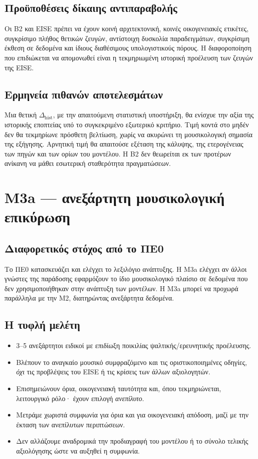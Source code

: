 \documentclass[11pt,a4paper]{extarticle}
\begin{document}
\subsection*{Προϋποθέσεις δίκαιης αντιπαραβολής}
Οι B2 και EISE πρέπει να έχουν κοινή αρχιτεκτονική, κοινές οικογενειακές ετικέτες, συγκρίσιμο πλήθος θετικών ζευγών, αντίστοιχη δυσκολία παραδειγμάτων, συγκρίσιμη έκθεση σε δεδομένα και ίδιους διαθέσιμους υπολογιστικούς πόρους. Η διαφοροποίηση που επιδιώκεται να απομονωθεί είναι η τεκμηριωμένη ιστορική προέλευση των ζευγών της EISE.

\subsection*{Ερμηνεία πιθανών αποτελεσμάτων}
Μια θετική \(\Delta_{\mathrm{hist}}\), με την απαιτούμενη στατιστική υποστήριξη, θα ενίσχυε την αξία της ιστορικής εποπτείας υπό το συγκεκριμένο εξωτερικό κριτήριο. Τιμή κοντά στο μηδέν δεν θα τεκμηρίωνε πρόσθετη βελτίωση, χωρίς να ακυρώνει τη μουσικολογική σημασία της εξήγησης. Αρνητική τιμή θα απαιτούσε εξέταση της κάλυψης, της ετερογένειας των πηγών και των ορίων του μοντέλου. Η B2 δεν θεωρείται εκ των προτέρων ανίκανη να μάθει εσωτερική σταθερότητα πραγματώσεων.


\section{M3a — ανεξάρτητη μουσικολογική επικύρωση}
\subsection*{Διαφορετικός στόχος από το ΠΕ0}
Το ΠΕ0 κατασκευάζει και ελέγχει το λεξιλόγιο ανάπτυξης. Η M3a ελέγχει αν άλλοι γνώστες της παράδοσης εφαρμόζουν το ίδιο μουσικολογικό πλαίσιο σε δεδομένα που δεν χρησιμοποιήθηκαν στην ανάπτυξη των μοντέλων. Η M3a μπορεί να προχωρά παράλληλα με την M2, διατηρώντας ανεξάρτητα δεδομένα.
\subsection*{Η τυφλή μελέτη}
\begin{itemize}
\item 3--5 ανεξάρτητοι ειδικοί με επιδίωξη ποικιλίας ψαλτικής/ερευνητικής προέλευσης.
\item Βλέπουν το αναγκαίο μουσικό συμφραζόμενο και τις οριστικοποιημένες οδηγίες, \emph{όχι} τις προβλέψεις του EISE ή τις κρίσεις των άλλων αξιολογητών.
\item Επισημειώνουν όρια, οικογενειακή ταυτότητα και, όπου τεκμηριώνεται, λειτουργικό ρόλο· έχουν επιλογή \emph{ανεπίλυτο}.
\item Μετράμε χωριστά συμφωνία για όρια και για οικογενειακή απόδοση, μαζί με την έκταση των ανεπίλυτων περιπτώσεων.
\item Δεν αλλάζουμε αναδρομικά την προδιαγραφή του μοντέλου ή το σύνολο τελικής αξιολόγησης ώστε να αυξηθεί η συμφωνία.
\end{itemize}
\end{document}
